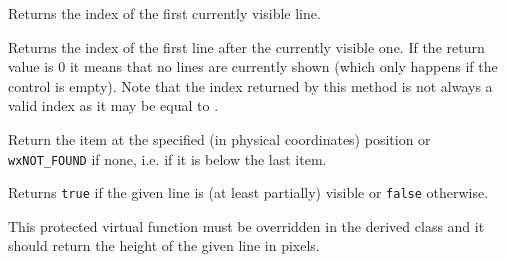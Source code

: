 \label{wxvscrolledwindowgetvisiblebegin}


Returns the index of the first currently visible line.




\label{wxvscrolledwindowgetvisibleend}


Returns the index of the first line after the currently visible one. If the
return value is $0$ it means that no lines are currently shown (which only
happens if the control is empty). Note that the index returned by this method
is not always a valid index as it may be equal to .




\label{wxvscrolledwindowhittest}



Return the item at the specified (in physical coordinates) position or
{\tt wxNOT\_FOUND} if none, i.e. if it is below the last item.


\label{wxvscrolledwindowisvisible}


Returns {\tt true} if the given line is (at least partially) visible or
{\tt false} otherwise.


\label{wxvscrolledwindowongetlineheight}


This protected virtual function must be overridden in the derived class and it
should return the height of the given line in pixels.




